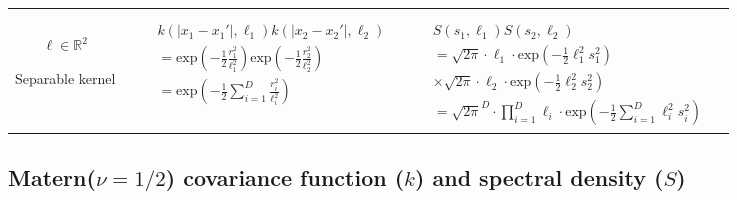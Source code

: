 \documentclass[]{interact}
\theoremstyle{plain}%
\theoremstyle{definition}
\theoremstyle{remark}
\begin{document}
\begin{landscape}
\begin{table}[H]
\begin{center}
\begin{tabular}{|c|c|c|c|}
       & \multicolumn{1}{|p{6.2cm}|}{

       } \\
       \vspace{-10mm}\\
       \cline{1-3}
       
       \multicolumn{1}{|p{1.5cm}|}{
       \vspace{1mm}
       $\bm{\ell} \in \mathbb{R}^2$
       
       {Separable kernel} 
       }
       
        & \multicolumn{1}{|p{7.2cm}|}{
         \begin{eqnarray*}
		&&k(|x_1-x_1'|,\ell_1)k(|x_2-x_2'|,\ell_2) \\
		&&= \mathrm{exp}\left(-\frac{1}{2} \frac{r_1^2}{\ell_1^2} \right) \mathrm{exp}\left(-\frac{1}{2} \frac{r_2^2}{\ell_2^2} \right) \\
		&&= \mathrm{exp}\left(-\frac{1}{2} \sum_{i=1}^{D}\frac{r_i^2}{\ell_i^2} \right)
         \end{eqnarray*}
       }
       
       & \multicolumn{1}{|p{8.2cm}|}{
         \begin{eqnarray*}
		&&S(s_1,\ell_1)S(s_2,\ell_2) \\
		&&= \sqrt{2\pi} \cdot \ell_1 \cdot \mathrm{exp}\left(-\frac{1}{2} \ell_1^2 s_1^2 \right) \\
		&& \times \sqrt{2\pi} \cdot \ell_2 \cdot \mathrm{exp}\left(-\frac{1}{2} \ell_2^2 s_2^2 \right)\\
		&&= \sqrt{2\pi}^D \cdot \prod_{i=1}^D \ell_i \cdot \mathrm{exp}\left(-\frac{1}{2} \sum_{i=1}^D \ell_i^2 s_i^2 \right)
         \end{eqnarray*}
       } 

       & \multicolumn{1}{|p{6.2cm}|}{

       } \\
              
       \hline
       
    \end{tabular}
  \end{center}
\end{table}



\newpage	
\subsection{Matern($\nu=1/2$) covariance function ($k$) \textbf and spectral density ($S$)}
\vspace{-2mm}

\end{landscape}
\end{document}
